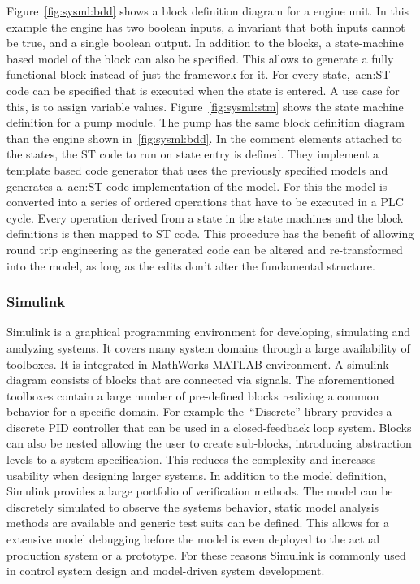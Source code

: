 Figure~\ref{fig:sysml:bdd} shows a block definition diagram for a engine unit.
In this example the engine has two boolean inputs, a invariant that both inputs cannot be true, and a single boolean output.
In addition to the blocks, a state-machine based model of the block can also be specified.
This allows to generate a fully functional block instead of just the framework for it.
For every state,~\acrshort{acn:ST} code can be specified that is executed when the state is entered.
A use case for this, is to assign variable values.
Figure~\ref{fig:sysml:stm} shows the state machine definition for a pump module.
The pump has the same block definition diagram than the engine shown in~\ref{fig:sysml:bdd}.
In the comment elements attached to the states, the ST code to run on state entry is defined.
They implement a template based code generator that uses the previously specified models and generates a~\acrshort{acn:ST} code implementation of the model.
For this the model is converted into a series of ordered operations that have to be executed in a PLC cycle.
Every operation derived from a state in the state machines and the block definitions is then mapped to ST code.
This procedure has the benefit of allowing round trip engineering as the generated code can be altered and re-transformed into the model, as long as the edits don't alter the fundamental structure.

\subsubsection{Simulink}
\label{sec:sub:simulink}

Simulink is a graphical programming environment for developing, simulating and analyzing systems.
It covers many system domains through a large availability of toolboxes.
It is integrated in MathWorks MATLAB environment.
A simulink diagram consists of blocks that are connected via signals.
The aforementioned toolboxes contain a large number of pre-defined blocks realizing a common behavior for a specific domain.
For example the~\enquote{Discrete} library provides a discrete PID controller that can be used in a closed-feedback loop system.
Blocks can also be nested allowing the user to create sub-blocks, introducing abstraction levels to a system specification.
This reduces the complexity and increases usability when designing larger systems.
In addition to the model definition, Simulink provides a large portfolio of verification methods.
The model can be discretely simulated to observe the systems behavior, static model analysis methods are available and generic test suits can be defined.
This allows for a extensive model debugging before the model is even deployed to the actual production system or a prototype.
For these reasons Simulink is commonly used in control system design and model-driven system development.

